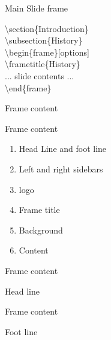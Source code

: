 \documentclass[10pt,blue,xcolor=pdftex,dvipsnames,table,handout]{beamer}
\begin{document}

		\begin{frame}{Main Slide frame}

			\textbackslash section\{Introduction\} \\
			\textbackslash subsection\{History\} \\
			\textbackslash begin\{frame\}[options] \\
			\textbackslash frametitle\{History\} \\
			... slide contents ... \\
			\textbackslash end\{frame\}  \\

		\end{frame}

		\begin{frame}{Frame content}

			\begin{block} {Frame content}
			\begin{enumerate}
			\item Head Line and foot line
			\item Left and right sidebars
			\item logo
			\item Frame title
			\item Background
			\item Content
			\end{enumerate}
			\end{block}

		\end{frame}


		\begin{frame}[t]{Frame content}

			\begin{block} {Head line}
			\end{block}

		\end{frame}

		\begin{frame}[t]{Frame content}

			\begin{block} {Foot line}
			\end{block}

		\end{frame}
\end{document}
